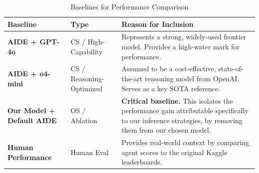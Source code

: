 \begin{table}[htbp]
\centering
\caption{Baselines for Performance Comparison}
\label{tab:baselines}
\begin{tabular}{p{4cm} l p{6.5cm}}
\toprule
\textbf{Baseline} & \textbf{Type} & \textbf{Reason for Inclusion} \\
\midrule
\textbf{AIDE + GPT-4o} & CS / High-Capability & Represents a strong, widely-used frontier model. Provides a high-water mark for performance. \\
\textbf{AIDE + o4-mini} & CS / Reasoning-Optimized & Assumed to be a cost-effective, state-of-the-art reasoning model from OpenAI. Serves as a key SOTA reference. \\
\textbf{Our Model + Default AIDE} & OS / Ablation & \textbf{Critical baseline.} This isolates the performance gain attributable specifically to our inference strategies, by removing them from our chosen model. \\
\textbf{Human Performance} & Human Eval & Provides real-world context by comparing agent scores to the original Kaggle leaderboards. \\
\bottomrule
\end{tabular}
\end{table}







